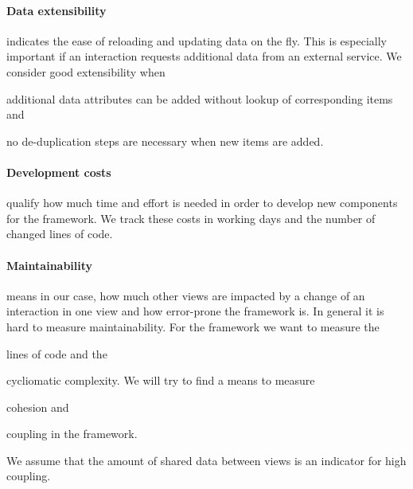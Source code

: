 \paragraph{Data extensibility} indicates the ease of reloading and updating data on the fly.
This is especially important if an interaction requests additional data from an external service.
We consider good extensibility when
\begin{enumerate*}[label=(\arabic*)]
  \item
    additional data attributes can be added without lookup of corresponding items and
  \item
    no de-duplication steps are necessary when new items are added.
\end{enumerate*}

\paragraph{Development costs} qualify how much time and effort is needed in order to develop new components for the \cmv{} framework.
We track these costs in working days and the number of changed lines of code.


\paragraph{Maintainability} means in our case, how much other views are impacted by a change of an interaction in one view and how error-prone the framework is.
In general it is hard to measure maintainability.
For the \cmv{} framework we want to measure the
\begin{enumerate*}[label=(\arabic*)]
  \item
    lines of code and the
  \item
    cycliomatic complexity. We will try to find a means to measure
  \item
    cohesion and
  \item 
    coupling in the framework.
\end{enumerate*}
We assume that the amount of shared data between views is an indicator for high coupling.





